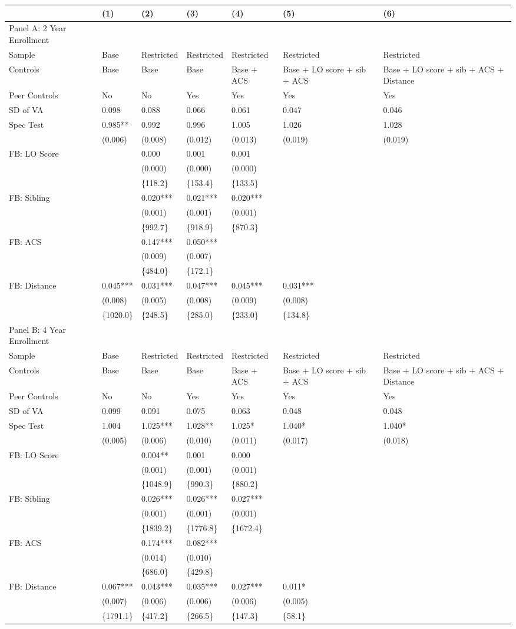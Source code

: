 \begin{table}[tbp] \centering
{}

{\footnotesize
\begin{tabularx}{\linewidth}{lCCCCCC}

\toprule
&{(1)}&{(2)}&{(3)}&{(4)}&{(5)}&{(6)} \tabularnewline
\midrule \addlinespace[\belowrulesep]
Panel A: 2 Year Enrollment&&&&&& \tabularnewline
\midrule Sample&Base&Restricted&Restricted&Restricted&Restricted&Restricted \tabularnewline
Controls&Base&Base&Base&Base + ACS&Base + LO score + sib + ACS&Base + LO score + sib + ACS + Distance \tabularnewline
Peer Controls&No&No&Yes&Yes&Yes&Yes \tabularnewline
\midrule SD of VA&0.098&0.088&0.066&0.061&0.047&0.046 \tabularnewline
Spec Test&0.985**&0.992&0.996&1.005&1.026&1.028 \tabularnewline
&(0.006)&(0.008)&(0.012)&(0.013)&(0.019)&(0.019) \tabularnewline
FB: LO Score&&0.000&0.001&0.001&& \tabularnewline
&&(0.000)&(0.000)&(0.000)&& \tabularnewline
&&\{118.2\}&\{153.4\}&\{133.5\}&& \tabularnewline
FB: Sibling&&0.020***&0.021***&0.020***&& \tabularnewline
&&(0.001)&(0.001)&(0.001)&& \tabularnewline
&&\{992.7\}&\{918.9\}&\{870.3\}&& \tabularnewline
FB: ACS&&0.147***&0.050***&&& \tabularnewline
&&(0.009)&(0.007)&&& \tabularnewline
&&\{484.0\}&\{172.1\}&&& \tabularnewline
FB: Distance&0.045***&0.031***&0.047***&0.045***&0.031***& \tabularnewline
&(0.008)&(0.005)&(0.008)&(0.009)&(0.008)& \tabularnewline
&\{1020.0\}&\{248.5\}&\{285.0\}&\{233.0\}&\{134.8\}& \tabularnewline
\midrule \midrule Panel B: 4 Year Enrollment&&&&&& \tabularnewline
\midrule Sample&Base&Restricted&Restricted&Restricted&Restricted&Restricted \tabularnewline
Controls&Base&Base&Base&Base + ACS&Base + LO score + sib + ACS&Base + LO score + sib + ACS + Distance \tabularnewline
Peer Controls&No&No&Yes&Yes&Yes&Yes \tabularnewline
\midrule SD of VA&0.099&0.091&0.075&0.063&0.048&0.048 \tabularnewline
Spec Test&1.004&1.025***&1.028**&1.025*&1.040*&1.040* \tabularnewline
&(0.005)&(0.006)&(0.010)&(0.011)&(0.017)&(0.018) \tabularnewline
FB: LO Score&&0.004**&0.001&0.000&& \tabularnewline
&&(0.001)&(0.001)&(0.001)&& \tabularnewline
&&\{1048.9\}&\{990.3\}&\{880.2\}&& \tabularnewline
FB: Sibling&&0.026***&0.026***&0.027***&& \tabularnewline
&&(0.001)&(0.001)&(0.001)&& \tabularnewline
&&\{1839.2\}&\{1776.8\}&\{1672.4\}&& \tabularnewline
FB: ACS&&0.174***&0.082***&&& \tabularnewline
&&(0.014)&(0.010)&&& \tabularnewline
&&\{686.0\}&\{429.8\}&&& \tabularnewline
FB: Distance&0.067***&0.043***&0.035***&0.027***&0.011*& \tabularnewline
&(0.007)&(0.006)&(0.006)&(0.006)&(0.005)& \tabularnewline
&\{1791.1\}&\{417.2\}&\{266.5\}&\{147.3\}&\{58.1\}& \tabularnewline
\bottomrule 

\end{tabularx}
}
\end{table}
